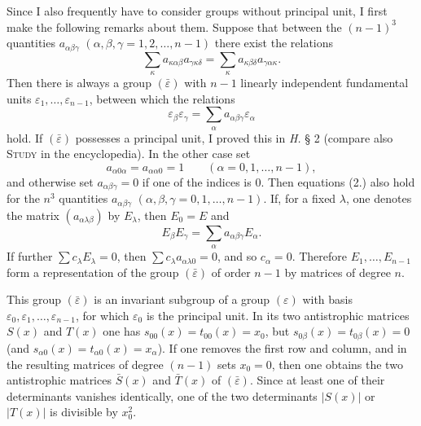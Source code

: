 \documentclass[11pt]{article}
\newcommand{\eps}{\varepsilon}
\begin{document}
Since I also frequently have to consider groups without principal unit, I first make the following remarks about them. Suppose that between the $(n-1)^3$ quantities $a_{\alpha\beta\gamma}$ $(\alpha,\beta,\gamma=1,2,\ldots,n-1)$ there exist the relations
\begin{equation}\tag{2.}
 \sum_{\kappa} a_{\kappa\alpha\beta}a_{\gamma\kappa\delta}
 =\sum_{\kappa} a_{\kappa\beta\delta}a_{\gamma\alpha\kappa}.
\end{equation}
Then there is always a group $(\bar\eps)$ with $n-1$ linearly independent fundamental units $\eps_1,\ldots,\eps_{n-1}$, between which the relations
\begin{equation}\tag{3.}
 \eps_{\beta}\eps_{\gamma}=\sum_{\alpha}a_{\alpha\beta\gamma}\eps_{\alpha}
\end{equation}
hold. If $(\bar\eps)$ possesses a principal unit, I proved this in \emph{H.} § 2 (compare also \textsc{Study} in the encyclopedia). In the other case set
\begin{equation}\tag{4.}
 a_{\alpha0\alpha}=a_{\alpha\alpha0}=1\qquad(\alpha=0,1,\ldots,n-1),
\end{equation}
and otherwise set $a_{\alpha\beta\gamma}=0$ if one of the indices is $0$. Then equations (2.) also hold for the $n^3$ quantities $a_{\alpha\beta\gamma}$ $(\alpha,\beta,\gamma=0,1,\ldots,n-1)$. If, for a fixed $\lambda$, one denotes the matrix $(a_{\alpha\lambda\beta})$ by $E_{\lambda}$, then $E_0=E$ and
\begin{equation}\tag{5.}
 E_{\beta}E_{\gamma}=\sum_{\alpha}a_{\alpha\beta\gamma}E_{\alpha}.
\end{equation}
If further $\sum c_{\lambda}E_{\lambda}=0$, then $\sum c_{\lambda}a_{\alpha\lambda0}=0$, and so $c_{\alpha}=0$. Therefore $E_1,\ldots,E_{n-1}$ form a representation of the group $(\bar\eps)$ of order $n-1$ by matrices of degree $n$.

This group $(\bar\eps)$ is an invariant subgroup of a group $(\eps)$ with basis $\eps_0,\eps_1,\ldots,\eps_{n-1}$, for which $\eps_0$ is the principal unit. In its two antistrophic matrices $S(x)$ and $T(x)$ one has $s_{00}(x)=t_{00}(x)=x_0$, but $s_{0\beta}(x)=t_{0\beta}(x)=0$ (and $s_{\alpha0}(x)=t_{\alpha0}(x)=x_{\alpha}$). If one removes the first row and column, and in the resulting matrices of degree $(n-1)$ sets $x_0=0$, then one obtains the two antistrophic matrices $\bar S(x)$ and $\bar T(x)$ of $(\bar\eps)$. Since at least one of their determinants vanishes identically, one of the two determinants $|S(x)|$ or $|T(x)|$ is divisible by $x_0^2$.
\end{document}
